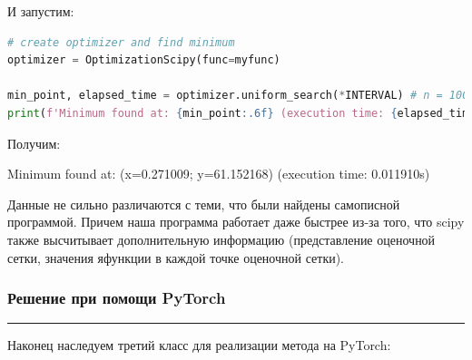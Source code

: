 \documentclass[a4paper, 14pt]{extarticle}
\begin{document}
И запустим:

\begin{center}
    \begin{lstlisting}[language=Python]
# create optimizer and find minimum
optimizer = OptimizationScipy(func=myfunc)

min_point, elapsed_time = optimizer.uniform_search(*INTERVAL) # n = 1000 (default)
print(f'Minimum found at: {min_point:.6f} (execution time: {elapsed_time:.6f}s)')
    \end{lstlisting}
\end{center}

Получим:

\begin{center}
    Minimum found at: (x=0.271009; y=61.152168) (execution time: 0.011910s)
\end{center}

Данные не сильно различаются с теми, что были найдены \guillemotleft самописной\guillemotright {} 
программой. Причем наша программа работает даже быстрее из-за того, что scipy также 
высчитывает дополнительную информацию (представление оценочной сетки, значения яфункции 
в каждой точке оценочной сетки).

\subsubsection*{Решение при помощи PyTorch}\vspace{-20pt}\rule{\linewidth}{0.1mm}

Наконец наследуем третий класс для реализации метода на PyTorch:
\end{document}
